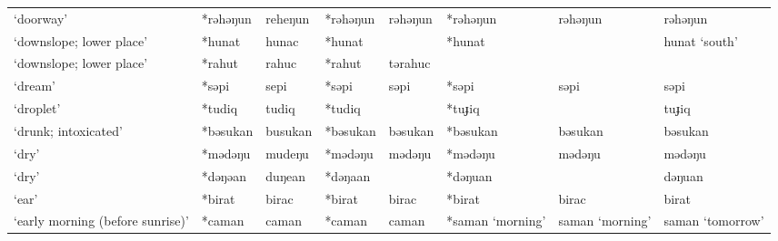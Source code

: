 \begin{landscape}
\begin{longtable}[c]{@{}p{3cm}<{\raggedright}p{2.75cm}<{\raggedright}p{2.75cm}<{\raggedright}p{2.75cm}<{\raggedright}p{2.75cm}<{\raggedright}p{2.75cm}<{\raggedright}p{2.75cm}<{\raggedright}p{2.75cm}<{\raggedright}@{}}
`doorway'                                            & *rəhəŋun           & reheŋun                        & *rəhəŋun           & rəhəŋun                    & *rəhəŋun         & rəhəŋun                  & rəhəŋun                           \\
`downslope; lower place'                             & *hunat             & hunac                          & *hunat             &                            & *hunat           &                          & hunat `south'                     \\
`downslope; lower place'                             & *rahut             & rahuc                          & *rahut             & tərahuc                    &                  &                          &                                   \\
`dream'                                              & *səpi              & sepi                           & *səpi              & səpi                       & *səpi            & səpi                     & səpi                              \\
`droplet'                                            & *tudiq             & tudiq                          & *tudiq             &                            & *tuɟiq           &                          & tuɟiq                             \\
`drunk; intoxicated'                                 & *bəsukan           & busukan                        & *bəsukan           & bəsukan                    & *bəsukan         & bəsukan                  & bəsukan                           \\
`dry'                                                & *mədəŋu            & mudeŋu                         & *mədəŋu            & mədəŋu                     & *mədəŋu          & mədəŋu                   & mədəŋu                            \\
`dry'                                                & *dəŋəan            & duŋean                         & *dəŋaan            &                            & *dəŋuan          &                          & dəŋuan                            \\
`ear'                                                & *birat             & birac                          & *birat             & birac                      & *birat           & birac                    & birat                             \\
`early morning (before sunrise)'                     & *caman             & caman                          & *caman             & caman                      & *saman `morning' & saman `morning'          & saman `tomorrow'                  \\

\end{longtable}
\end{landscape}
